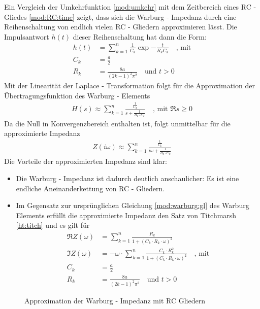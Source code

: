 Ein Vergleich der Umkehrfunktion \ref{mod:umkehr} mit dem Zeitbereich eines RC - Gliedes \ref{mod:RC:time} zeigt, dass sich die Warburg - Impedanz durch eine Reihenschaltung von endlich vielen RC - Gliedern approximieren lässt. Die Impulsantwort $h(t)$ dieser Reihenschaltung hat dann die Form:
\begin{align}
	h(t) &= \sum_{k = 1}^{n} \frac{1}{C_k} \exp{-\frac{t}{R_k C_k}} \quad \text{, mit}\\
	C_k  &= \frac{a}{2}  \\
	R_k 	 &= \frac{8 a}{(2 k - 1)^2 \pi^2} \quad \text{und } t > 0
\end{align}
Mit der Linearität der Laplace - Transformation folgt für die Approximation der Übertragungsfunktion des Warburg - Elements
\begin{align}
	H(s) \approx  \sum_{k = 1}^{n} \frac{\frac{1}{C_k}}{s + \frac{1}{R_k \cdot C_k}} \quad \text{, mit } \Re{s} \geq 0 
\end{align}
Da die Null in Konvergenzbereich enthalten ist, folgt unmittelbar für die approximierte Impedanz
\begin{align}
	Z(i \omega) \approx  \sum_{k = 1}^{n} \frac{\frac{1}{C_k}}{i \omega + \frac{1}{R_k \cdot C_k}}\label{mod:warburg:approx}
\end{align}
Die Vorteile der approximierten Impedanz sind klar: 
\begin{itemize}
	\item Die Warburg - Impedanz ist dadurch deutlich anschaulicher: Es ist eine endliche Aneinanderkettung von RC - Gliedern.
	\item Im Gegensatz zur ursprünglichen Gleichung \ref{mod:warburg:gl} des Warburg Elements erfüllt die approximierte Impedanz den Satz von Titchmarsh \ref{ht:titch} und 
	es gilt für
	\begin{align}
		\Re{Z(\omega)} &= \sum_{k = 1}^{n} \frac{R_k}{1 + (C_k \cdot R_k \cdot \omega)^2 }\\
		\Im{Z(\omega)} &= - \omega \cdot \sum_{k = 1}^{n} \frac{C_k \cdot R^2_k}{1 + (C_k \cdot R_k \cdot \omega)^2 } \quad \text{, mit}\\
		C_k  &= \frac{a}{2}  \\
		R_k 	 &= \frac{8 a}{(2 k - 1)^2 \pi^2} \quad \text{und } t > 0
	\end{align}
\end{itemize}
\begin{figure}
	\centering
	\def\svgwidth{1.0\columnwidth}
	
	\caption{Approximation der Warburg - Impedanz mit RC Gliedern}
	\label{fig:einfachModell}
\end{figure}
